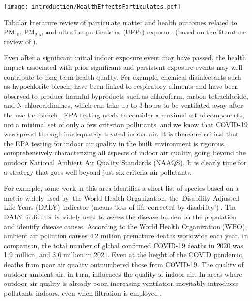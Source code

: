 \begin{table}[h!]
  \centering
  \texttt{[image: introduction/HealthEffectsParticulates.pdf]}
	\caption{Tabular literature review of particulate matter and health outcomes related to PM$_{10}$, PM$_{2.5}$, and ultrafine particulates (UFPs) exposure (based on the literature review of \cite{Lary:2015}).}
	\label{Table.HealthEffectsParticulates}
\end{table}


Even after a significant initial indoor exposure event may have passed, the health impact associated with prior significant and persistent exposure events may well contribute to long-term health quality. For example, chemical disinfectants such as hypochlorite bleach, have been linked to respiratory ailments and have been observed to produce harmful byproducts such as chloroform, carbon tetrachloride, and N-chloroaldimines, which can take up to 3 hours to be ventilated away after the use the bleach  \cite{finewax_quantification_2021, odabasi_halogenated_2008}. EPA testing needs to consider a maximal set of components, not a minimal set of only a few criterion pollutants, and we know that COVID-19 was spread through inadequately treated indoor air.  It is therefore critical that the EPA testing for indoor air quality in the built environment is rigorous, comprehensively characterizing all aspects of indoor air quality, going beyond the outdoor National Ambient Air Quality Standards (NAAQS). It is clearly time for a strategy that goes well beyond just six criteria air pollutants.

For example, some work in this area identifies a short list of species based on a metric widely used by the World Health Organization, the Disability Adjusted Life Years (DALY) indicator (means \lq loss of life corrected by disability') \cite{Juginovi:2021, Lehtomki:2018}. The DALY indicator is widely used to assess the disease burden on the population and identify disease causes. According to the World Health Organization (WHO), ambient air pollution causes 4.2 million premature deaths worldwide each year. In comparison, the total number of global confirmed COVID-19 deaths in 2020 was 1.9 million, and 3.6 million in 2021. Even at the height of the COVID pandemic, deaths from poor air quality outnumbered those from COVID-19. The quality of outdoor ambient air, in turn, influences the quality of indoor air. In areas where outdoor air quality is already poor, increasing ventilation inevitably introduces pollutants indoors, even when filtration is employed \cite{srikrishna_long-term_2022}.

